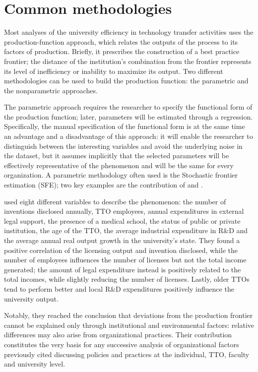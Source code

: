 \section{Common methodologies}

Most analyses of the university efficiency in technology transfer activities uses the production-function approach, which relates the outputs of the process to its factors of production. Briefly, it prescribes the construction of a best practice frontier; the distance of the institution's combination from the frontier represents its level of inefficiency or inability to maximize its output. Two different methodologies can be used to build the production function: the parametric and the nonparametric approaches.

The parametric approach requires the researcher to specify the functional form of the production function; later, parameters will be estimated through a regression. Specifically, the manual specification of the functional form is at the same time an advantage and a disadvantage of this approach: it will enable the researcher to distinguish between the interesting variables and avoid the underlying noise in the dataset, but it assumes implicitly that the selected parameters will be effectively representative of the phenomenon and will be the same for every organization. A parametric methodology often used is the Stochastic frontier estimation (SFE); two key examples are the contribution of \citet{Siegel2003a} and \citet{Link2005}.

\citet{Siegel2003a} used eight different variables to describe the phenomenon: the number of inventions disclosed annually, TTO employees, annual expenditures in external legal support, the presence of a medical school, the status of public or private institution, the age of the TTO, the average industrial expenditure in R\&D and the average annual real output growth in the university's state. They found a positive correlation of the licensing output and invention disclosed, while the number of employees influences the number of licenses but not the total income generated; the amount of legal expenditure instead is positively related to the total incomes, while slightly reducing the number of licenses. Lastly, older TTOs tend to perform better and local R\&D expenditures positively influence the university output. 

Notably, they reached the conclusion that deviations from the production frontier cannot be explained only through institutional and environmental factors: relative differences may also arise from organizational practices. Their contribution constitutes the very basis for any successive analysis of organizational factors previously cited discussing policies and practices at the individual, TTO, faculty and university level. 

